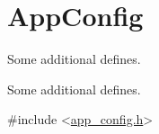 \hypertarget{group___app_config}{}\section{App\+Config}
\label{group___app_config}


Some additional defines.  


Some additional defines. 


\begin{DoxyCode}
\textcolor{preprocessor}{#include <\hyperlink{app__config_8h}{app\_config.h}>} 
\end{DoxyCode}
 